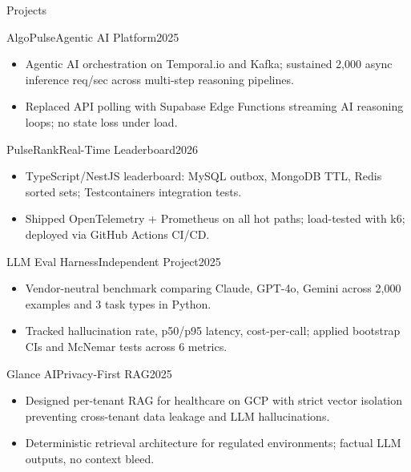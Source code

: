 \documentclass[]{mcdowellcv}
\begin{document}
\begin{cvsection}{Projects}
  \begin{cvsubsection}{AlgoPulse}{Agentic AI Platform}{2025}
    \begin{itemize}
      \item Agentic AI orchestration on Temporal.io and Kafka; sustained 2,000 async inference req/sec across multi-step reasoning pipelines.
      \item Replaced API polling with Supabase Edge Functions streaming AI reasoning loops; no state loss under load.
    \end{itemize}
    \vspace{-1.5pt}
  \end{cvsubsection}

  \begin{cvsubsection}{PulseRank}{Real-Time Leaderboard}{2026}
    \begin{itemize}
      \item TypeScript/NestJS leaderboard: MySQL outbox, MongoDB TTL, Redis sorted sets; Testcontainers integration tests.
      \item Shipped OpenTelemetry + Prometheus on all hot paths; load-tested with k6; deployed via GitHub Actions CI/CD.
    \end{itemize}
    \vspace{-1.5pt}
  \end{cvsubsection}

  \begin{cvsubsection}{LLM Eval Harness}{Independent Project}{2025}
    \begin{itemize}
      \item Vendor-neutral benchmark comparing Claude, GPT-4o, Gemini across 2,000 examples and 3 task types in Python.
      \item Tracked hallucination rate, p50/p95 latency, cost-per-call; applied bootstrap CIs and McNemar tests across 6 metrics.
    \end{itemize}
    \vspace{-1.5pt}
  \end{cvsubsection}

  \begin{cvsubsection}{Glance AI}{Privacy-First RAG}{2025}
    \begin{itemize}
      \item Designed per-tenant RAG for healthcare on GCP with strict vector isolation preventing cross-tenant data leakage and LLM hallucinations.
      \item Deterministic retrieval architecture for regulated environments; factual LLM outputs, no context bleed.
    \end{itemize}
  \end{cvsubsection}
\end{cvsection}
\end{document}
